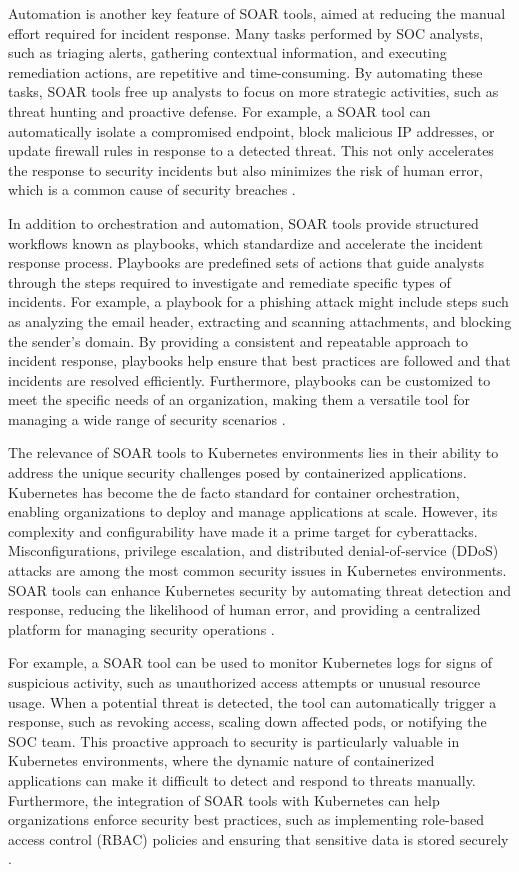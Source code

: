 Automation is another key feature of SOAR tools, aimed at reducing the manual effort required for incident response. Many tasks performed by SOC analysts, such as triaging alerts, gathering contextual information, and executing remediation actions, are repetitive and time-consuming. By automating these tasks, SOAR tools free up analysts to focus on more strategic activities, such as threat hunting and proactive defense. For example, a SOAR tool can automatically isolate a compromised endpoint, block malicious IP addresses, or update firewall rules in response to a detected threat. This not only accelerates the response to security incidents but also minimizes the risk of human error, which is a common cause of security breaches \citep{bridges2023}.

In addition to orchestration and automation, SOAR tools provide structured workflows known as playbooks, which standardize and accelerate the incident response process. Playbooks are predefined sets of actions that guide analysts through the steps required to investigate and remediate specific types of incidents. For example, a playbook for a phishing attack might include steps such as analyzing the email header, extracting and scanning attachments, and blocking the sender's domain. By providing a consistent and repeatable approach to incident response, playbooks help ensure that best practices are followed and that incidents are resolved efficiently. Furthermore, playbooks can be customized to meet the specific needs of an organization, making them a versatile tool for managing a wide range of security scenarios \citep{bridges2023}.

The relevance of SOAR tools to Kubernetes environments lies in their ability to address the unique security challenges posed by containerized applications. Kubernetes has become the de facto standard for container orchestration, enabling organizations to deploy and manage applications at scale. However, its complexity and configurability have made it a prime target for cyberattacks. Misconfigurations, privilege escalation, and distributed denial-of-service (DDoS) attacks are among the most common security issues in Kubernetes environments. SOAR tools can enhance Kubernetes security by automating threat detection and response, reducing the likelihood of human error, and providing a centralized platform for managing security operations \citep{empl2022}.

For example, a SOAR tool can be used to monitor Kubernetes logs for signs of suspicious activity, such as unauthorized access attempts or unusual resource usage. When a potential threat is detected, the tool can automatically trigger a response, such as revoking access, scaling down affected pods, or notifying the SOC team. This proactive approach to security is particularly valuable in Kubernetes environments, where the dynamic nature of containerized applications can make it difficult to detect and respond to threats manually. Furthermore, the integration of SOAR tools with Kubernetes can help organizations enforce security best practices, such as implementing role-based access control (RBAC) policies and ensuring that sensitive data is stored securely \citep{bridges2023}.

